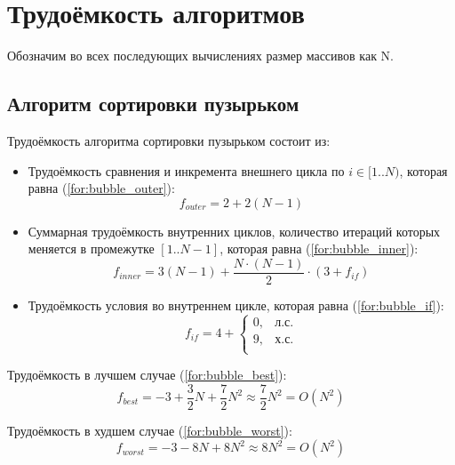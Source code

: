 \section{Трудоёмкость алгоритмов}

Обозначим во всех последующих вычислениях размер массивов как N.

\subsection{Алгоритм сортировки пузырьком}

Трудоёмкость алгоритма сортировки пузырьком состоит из:
\begin{itemize}
    \item Трудоёмкость сравнения и инкремента внешнего цикла по $i \in [1..N)$, которая равна (\ref{for:bubble_outer}):
        \begin{equation}
            \label{for:bubble_outer}
            f_{outer} = 2 + 2(N - 1)
        \end{equation}
    \item Суммарная трудоёмкость внутренних циклов, количество итераций которых меняется в промежутке $[1..N-1]$, которая равна (\ref{for:bubble_inner}):
        \begin{equation}
            \label{for:bubble_inner}
            f_{inner} = 3(N - 1) + \frac{N \cdot (N - 1)}{2} \cdot (3 + f_{if})
        \end{equation}
    \item Трудоёмкость условия во внутреннем цикле, которая равна (\ref{for:bubble_if}):
        \begin{equation}
            \label{for:bubble_if}
            f_{if} = 4 + \begin{cases}
                0, & \text{л.с.}\\
                9, & \text{х.с.}\\
            \end{cases}
        \end{equation}
\end{itemize}

Трудоёмкость в лучшем случае (\ref{for:bubble_best}):
\begin{equation}
    \label{for:bubble_best}
    f_{best} = -3 + \frac{3}{2} N + \frac{7}{2} N^2 \approx \frac{7}{2} N^2 = O(N^2)
\end{equation}

Трудоёмкость в худшем случае (\ref{for:bubble_worst}):
\begin{equation}
    \label{for:bubble_worst}
    f_{worst} = -3 - 8N + 8N^2 \approx 8N^2 = O(N^2)
\end{equation}

